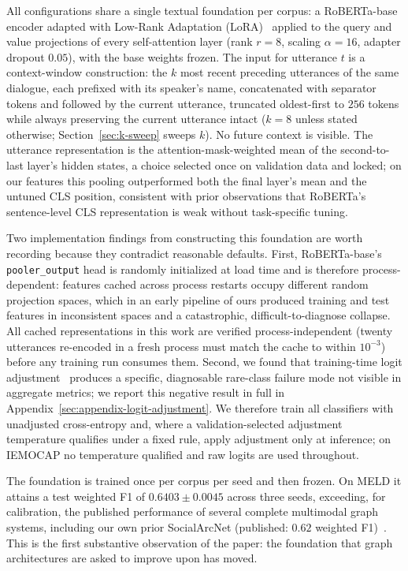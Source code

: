 All configurations share a single textual foundation per corpus: a RoBERTa-base encoder adapted with Low-Rank Adaptation (LoRA)~\cite{hu2022lora} applied to the query and value projections of every self-attention layer (rank $r{=}8$, scaling $\alpha{=}16$, adapter dropout $0.05$), with the base weights frozen. The input for utterance $t$ is a context-window construction: the $k$ most recent preceding utterances of the same dialogue, each prefixed with its speaker's name, concatenated with separator tokens and followed by the current utterance, truncated oldest-first to $256$ tokens while always preserving the current utterance intact ($k{=}8$ unless stated otherwise; Section~\ref{sec:k-sweep} sweeps $k$). No future context is visible. The utterance representation is the attention-mask-weighted mean of the second-to-last layer's hidden states, a choice selected once on validation data and locked; on our features this pooling outperformed both the final layer's mean and the untuned CLS position, consistent with prior observations that RoBERTa's sentence-level CLS representation is weak without task-specific tuning.

Two implementation findings from constructing this foundation are worth recording because they contradict reasonable defaults. First, RoBERTa-base's \texttt{pooler\_output} head is randomly initialized at load time and is therefore process-dependent: features cached across process restarts occupy different random projection spaces, which in an early pipeline of ours produced training and test features in inconsistent spaces and a catastrophic, difficult-to-diagnose collapse. All cached representations in this work are verified process-independent (twenty utterances re-encoded in a fresh process must match the cache to within $10^{-3}$) before any training run consumes them. Second, we found that training-time logit adjustment~\cite{menon2021logitadjustment} produces a specific, diagnosable rare-class failure mode not visible in aggregate metrics; we report this negative result in full in Appendix~\ref{sec:appendix-logit-adjustment}. We therefore train all classifiers with unadjusted cross-entropy and, where a validation-selected adjustment temperature qualifies under a fixed rule, apply adjustment only at inference; on IEMOCAP no temperature qualified and raw logits are used throughout.

The foundation is trained once per corpus per seed and then frozen. On MELD it attains a test weighted F1 of $0.6403 \pm 0.0045$ across three seeds, exceeding, for calibration, the published performance of several complete multimodal graph systems, including our own prior SocialArcNet (published: $0.62$ weighted F1)~\cite{socialarcnet2026}. This is the first substantive observation of the paper: the foundation that graph architectures are asked to improve upon has moved.

